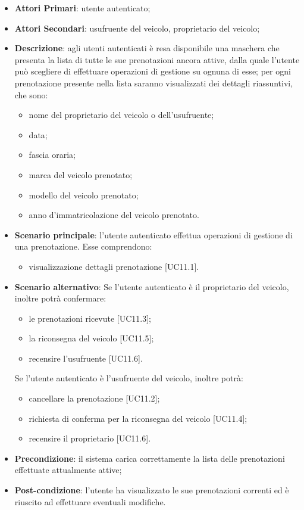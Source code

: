 \begin{itemize}
	\item \textbf{Attori Primari}: utente autenticato;
	\item \textbf{Attori Secondari}:
	usufruente del veicolo, proprietario del veicolo;
	\item \textbf{Descrizione}: agli utenti autenticati è resa disponibile una maschera che presenta la lista di tutte le sue prenotazioni ancora attive, dalla quale l'utente può scegliere di effettuare operazioni di gestione su ognuna di esse;
	per ogni prenotazione presente nella lista saranno visualizzati dei dettagli riassuntivi, che sono:
	\begin{itemize}
		\item nome del proprietario del veicolo o dell'usufruente;
		\item data;
		\item fascia oraria;
		\item marca del veicolo prenotato;
		\item modello del veicolo prenotato;
		\item anno d'immatricolazione del veicolo prenotato.
	\end{itemize}
	\item \textbf{Scenario principale}: l'utente autenticato effettua operazioni di gestione di una prenotazione. Esse comprendono:
	\begin{itemize}
		\item visualizzazione dettagli prenotazione [UC11.1].
	\end{itemize}
	\item \textbf{Scenario alternativo}: Se l'utente autenticato è il proprietario del veicolo, inoltre potrà confermare:
	\begin{itemize}
		\item le prenotazioni ricevute [UC11.3];
		\item la riconsegna del veicolo [UC11.5];
		\item recensire l'usufruente [UC11.6].
	\end{itemize}
	Se l'utente autenticato è l'usufruente del veicolo, inoltre potrà:
	\begin{itemize}
		\item cancellare la prenotazione [UC11.2];
		\item richiesta di conferma per la riconsegna del veicolo [UC11.4];
		\item recensire il proprietario [UC11.6].
	\end{itemize}
	\item \textbf{Precondizione}: il sistema carica correttamente la lista delle prenotazioni effettuate attualmente attive;
	\item \textbf{Post-condizione}: l'utente ha visualizzato le sue prenotazioni correnti ed è riuscito ad effettuare eventuali modifiche.
\end{itemize} 

